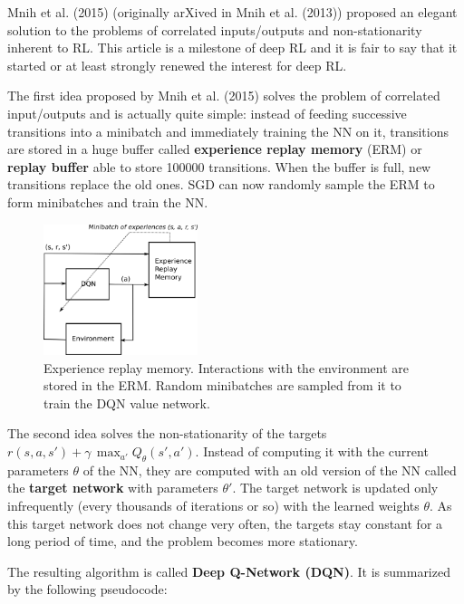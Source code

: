 \documentclass[
  letterpaper,
  DIV=11,
  numbers=noendperiod]{scrreprt}
\begin{document}
Mnih et al. (2015) (originally arXived in Mnih et al. (2013)) proposed
an elegant solution to the problems of correlated inputs/outputs and
non-stationarity inherent to RL. This article is a milestone of deep RL
and it is fair to say that it started or at least strongly renewed the
interest for deep RL.

The first idea proposed by Mnih et al. (2015) solves the problem of
correlated input/outputs and is actually quite simple: instead of
feeding successive transitions into a minibatch and immediately training
the NN on it, transitions are stored in a huge buffer called
\textbf{experience replay memory} (ERM) or \textbf{replay buffer} able
to store 100000 transitions. When the buffer is full, new transitions
replace the old ones. SGD can now randomly sample the ERM to form
minibatches and train the NN.

\begin{figure}

{\centering \includegraphics[width=0.4\textwidth,height=\textheight]{./img/ERM.png}

}

\caption{\label{fig-erm}Experience replay memory. Interactions with the
environment are stored in the ERM. Random minibatches are sampled from
it to train the DQN value network.}

\end{figure}

The second idea solves the non-stationarity of the targets
\(r(s, a, s') + \gamma \, \max_{a'} Q_\theta(s', a')\). Instead of
computing it with the current parameters \(\theta\) of the NN, they are
computed with an old version of the NN called the \textbf{target
network} with parameters \(\theta'\). The target network is updated only
infrequently (every thousands of iterations or so) with the learned
weights \(\theta\). As this target network does not change very often,
the targets stay constant for a long period of time, and the problem
becomes more stationary.

The resulting algorithm is called \textbf{Deep Q-Network (DQN)}. It is
summarized by the following pseudocode:
\end{document}
